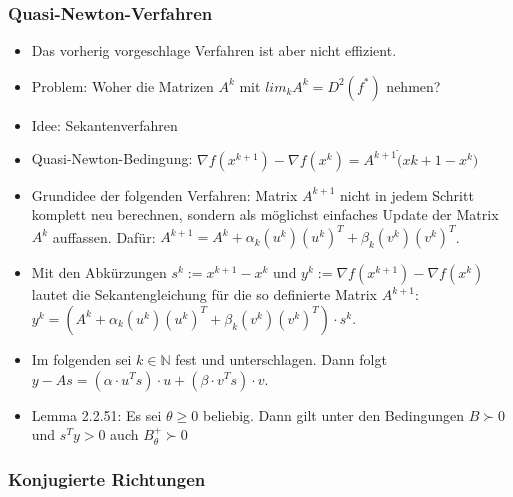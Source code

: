 \documentclass[paper=a4, fontsize=11pt]{scrartcl} %
\numberwithin{equation}{section} %
\numberwithin{figure}{section} %
\numberwithin{table}{section} %
\begin{document}
\subsubsection{Quasi-Newton-Verfahren}

\begin{itemize}
  \item Das vorherig vorgeschlage Verfahren ist aber nicht effizient.
  \item Problem: Woher die Matrizen $A^k$ mit $lim_k A^k = D^2(f^*)$ nehmen?
  \item Idee: Sekantenverfahren
  \item Quasi-Newton-Bedingung: $\nabla f(x^{k+1}) - \nabla f(x^k) = A^{k+1} \dot (x{k+1} - x^k)$
  \item Grundidee der folgenden Verfahren: Matrix $A^{k+1}$ nicht in jedem Schritt komplett neu berechnen, sondern als möglichst einfaches Update der Matrix $A^k$ auffassen. Dafür: $A^{k+1} = A^k + \alpha_k(u^k)(u^k)^T+\beta_k(v^k)(v^k)^T$.
  \item Mit den Abkürzungen $s^k := x^{k+1} - x^k$ und $y^k := \nabla f(x^{k+1}) - \nabla f(x^k)$ lautet die Sekantengleichung für die so definierte Matrix $A^{k+1}$: $y^k = (A^k+\alpha_k(u^k)(u^k)^T+\beta_k(v^k)(v^k)^T) \cdot s^k$.
  \item Im folgenden sei $k \in \mathbb{N}$ fest und unterschlagen. Dann folgt $y - As = (\alpha \cdot u^Ts) \cdot u + (\beta \cdot v^T s) \cdot v$.
  \item Lemma 2.2.51: Es sei $\theta \ge 0$ beliebig. Dann gilt unter den Bedingungen $B \succ 0$ und $s^T y > 0$ auch $B^+_\theta \succ 0$
\end{itemize}

\subsubsection{Konjugierte Richtungen}
\end{document}
